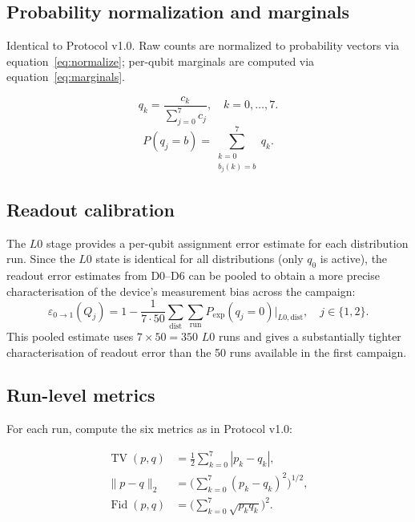 \documentclass[11pt,a4paper]{article}
\newcommand{\TV}{\operatorname{TV}}
\newcommand{\Fid}{\operatorname{Fid}}
\begin{document}
\subsection{Probability normalization and marginals}

Identical to Protocol v1.0. Raw counts are normalized to
probability vectors via equation~\eqref{eq:normalize}; per-qubit
marginals are computed via equation~\eqref{eq:marginals}.

\begin{equation}
  q_k = \frac{c_k}{\sum_{j=0}^{7} c_j}, \quad k = 0, \ldots, 7.
  \label{eq:normalize}
\end{equation}
\begin{equation}
  P(q_j = b) = \sum_{\substack{k=0\\ b_j(k)=b}}^{7} q_k.
  \label{eq:marginals}
\end{equation}

\subsection{Readout calibration}

The $L0$ stage provides a per-qubit assignment error estimate for
each distribution run. Since the $L0$ state is identical for all
distributions (only $q_0$ is active), the readout error
estimates from D0--D6 can be pooled to obtain a more precise
characterisation of the device's measurement bias across the
campaign:
\begin{equation}
  \varepsilon_{0\to1}(Q_j) =
    1 - \frac{1}{7 \cdot 50}
    \sum_{\text{dist}} \sum_{\text{run}} P_{\mathrm{exp}}(q_j=0)
    \Big|_{L0, \text{dist}},
  \quad j \in \{1, 2\}.
  \label{eq:readout-pooled}
\end{equation}
This pooled estimate uses $7 \times 50 = 350$ $L0$ runs and
gives a substantially tighter characterisation of readout error
than the 50 runs available in the first campaign.

\subsection{Run-level metrics}

For each run, compute the six metrics as in Protocol v1.0:

\begin{align}
  \TV(p, q) &= \tfrac{1}{2} \sum_{k=0}^{7} |p_k - q_k|,
  \label{eq:tv}\\
  \|p-q\|_2 &= \bigl(\textstyle\sum_{k=0}^{7}(p_k-q_k)^2\bigr)^{1/2},
  \label{eq:l2}\\
  \Fid(p, q) &= \bigl(\textstyle\sum_{k=0}^{7}\sqrt{p_k q_k}\bigr)^2.
  \label{eq:fidelity}
\end{align}
\end{document}
